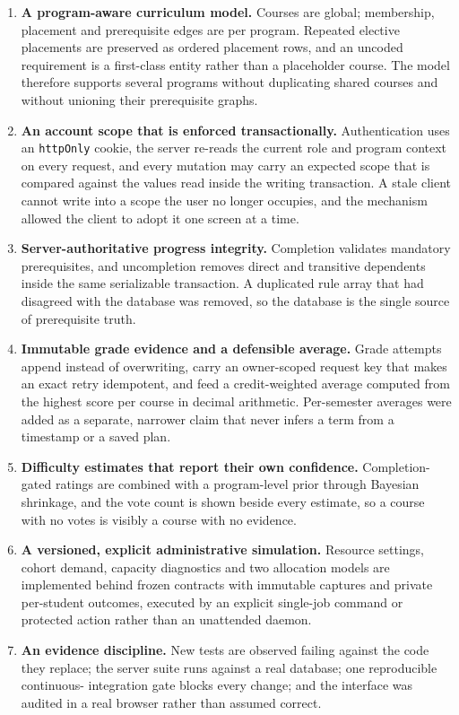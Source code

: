 \begin{enumerate}
  \item \textbf{A program-aware curriculum model.} Courses are global; membership, placement and
        prerequisite edges are per program. Repeated elective placements are preserved as ordered
        placement rows, and an uncoded requirement is a first-class entity rather than a placeholder
        course. The model therefore supports several programs without duplicating shared courses
        and without unioning their prerequisite graphs.

  \item \textbf{An account scope that is enforced transactionally.} Authentication uses an
        {\tt httpOnly} cookie, the server re-reads the current role and program context on every
        request, and every mutation may carry an expected scope that is compared against the values
        read inside the writing transaction. A stale client cannot write into a scope the user no
        longer occupies, and the mechanism allowed the client to adopt it one screen at a time.

  \item \textbf{Server-authoritative progress integrity.} Completion validates mandatory
        prerequisites, and uncompletion removes direct and transitive dependents inside the same
        serializable transaction. A duplicated rule array that had disagreed with the database was
        removed, so the database is the single source of prerequisite truth.

  \item \textbf{Immutable grade evidence and a defensible average.} Grade attempts append instead of
        overwriting, carry an owner-scoped request key that makes an exact retry idempotent, and feed
        a credit-weighted average computed from the highest score per course in decimal arithmetic.
        Per-semester averages were added as a separate, narrower claim that never infers a term from
        a timestamp or a saved plan.

  \item \textbf{Difficulty estimates that report their own confidence.} Completion-gated ratings are
        combined with a program-level prior through Bayesian shrinkage, and the vote count is shown
        beside every estimate, so a course with no votes is visibly a course with no evidence.

  \item \textbf{A versioned, explicit administrative simulation.} Resource settings, cohort demand,
        capacity diagnostics and two allocation models are implemented behind frozen contracts with
        immutable captures and private per-student outcomes, executed by an explicit single-job
        command or protected action rather than an unattended daemon.

  \item \textbf{An evidence discipline.} New tests are observed failing against the code they
        replace; the server suite runs against a real database; one reproducible continuous-
        integration gate blocks every change; and the interface was audited in a real browser rather
        than assumed correct.
\end{enumerate}

